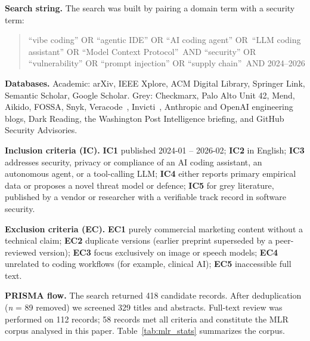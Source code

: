 \documentclass[twocolumn]{svjour3}
\begin{document}
\noindent\textbf{Search string.}
The search was built by pairing a domain term with a security term:
\begin{quote}\small
``vibe coding'' OR ``agentic IDE'' OR ``AI coding agent'' OR\
``LLM coding assistant'' OR ``Model Context Protocol''\
AND ``security'' OR ``vulnerability'' OR ``prompt injection'' OR ``supply chain''\
AND 2024--2026
\end{quote}

\noindent\textbf{Databases.}
Academic: arXiv, IEEE Xplore, ACM Digital Library, Springer Link, Semantic Scholar, Google Scholar. Grey: Checkmarx, Palo Alto Unit 42, Mend, Aikido, FOSSA, Snyk, Veracode~\cite{veracode2025aicode}, Invicti~\cite{invicti2025aiappsec}, Anthropic and OpenAI engineering blogs, Dark Reading, the Washington Post Intelligence briefing, and GitHub Security Advisories.

\noindent\textbf{Inclusion criteria (IC).}
\textbf{IC1} published 2024-01 -- 2026-02;
\textbf{IC2} in English;
\textbf{IC3} addresses security, privacy or compliance of an AI coding assistant, an autonomous agent, or a tool-calling LLM;
\textbf{IC4} either reports primary empirical data or proposes a novel threat model or defence;
\textbf{IC5} for grey literature, published by a vendor or researcher with a verifiable track record in software security.

\noindent\textbf{Exclusion criteria (EC).}
\textbf{EC1} purely commercial marketing content without a technical claim;
\textbf{EC2} duplicate versions (earlier preprint superseded by a peer-reviewed version);
\textbf{EC3} focus exclusively on image or speech models;
\textbf{EC4} unrelated to coding workflows (for example, clinical AI);
\textbf{EC5} inaccessible full text.

\noindent\textbf{PRISMA flow.}
The search returned 418 candidate records. After deduplication (\textit{n} = 89 removed) we screened 329 titles and abstracts. Full-text review was performed on 112 records; 58 records met all criteria and constitute the MLR corpus analysed in this paper. Table~\ref{tab:mlr_stats} summarizes the corpus.
\end{document}
